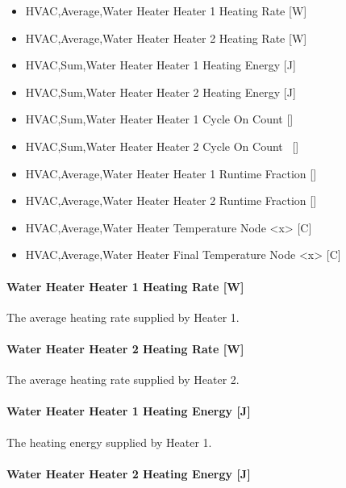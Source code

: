 \begin{itemize}
\item
  HVAC,Average,Water Heater Heater 1 Heating Rate {[}W{]}
\item
  HVAC,Average,Water Heater Heater 2 Heating Rate {[}W{]}
\item
  HVAC,Sum,Water Heater Heater 1 Heating Energy {[}J{]}
\item
  HVAC,Sum,Water Heater Heater 2 Heating Energy {[}J{]}
\item
  HVAC,Sum,Water Heater Heater 1 Cycle On Count {[]}
\item
  HVAC,Sum,Water Heater Heater 2 Cycle On Count~ {[]}
\item
  HVAC,Average,Water Heater Heater 1 Runtime Fraction {[]}
\item
  HVAC,Average,Water Heater Heater 2 Runtime Fraction {[]}
\item
  HVAC,Average,Water Heater Temperature Node \textless{}x\textgreater{} {[}C{]}
\item
  HVAC,Average,Water Heater Final Temperature Node \textless{}x\textgreater{} {[}C{]}
\end{itemize}

\paragraph{Water Heater Heater 1 Heating Rate {[}W{]}}\label{water-heater-heater-1-heating-rate-w}

The average heating rate supplied by Heater 1.

\paragraph{Water Heater Heater 2 Heating Rate {[}W{]}}\label{water-heater-heater-2-heating-rate-w}

The average heating rate supplied by Heater 2.

\paragraph{Water Heater Heater 1 Heating Energy {[}J{]}}\label{water-heater-heater-1-heating-energy-j}

The heating energy supplied by Heater 1.

\paragraph{Water Heater Heater 2 Heating Energy {[}J{]}}\label{water-heater-heater-2-heating-energy-j}

